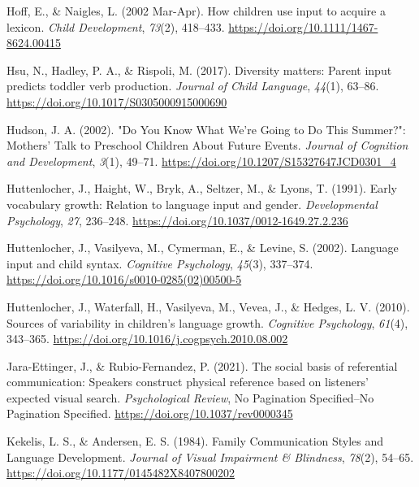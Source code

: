 \documentclass[
  man,floatsintext]{apa6}
\newlength{\cslhangindent}
\newlength{\cslentryspacingunit} %
\newenvironment{CSLReferences}[2] %
 {%
  \setlength{\parindent}{0pt}
  \ifodd #1
  \let\oldpar\par
  \def\par{\hangindent=\cslhangindent\oldpar}
  \fi
  \setlength{\parskip}{#2\cslentryspacingunit}
 }%
 {}
\begin{document}
\begin{CSLReferences}{1}{0}
\leavevmode{}%
Hoff, E., \& Naigles, L. (2002 Mar-Apr). How children use input to acquire a lexicon. \emph{Child Development}, \emph{73}(2), 418--433. \url{https://doi.org/10.1111/1467-8624.00415}

\leavevmode{}%
Hsu, N., Hadley, P. A., \& Rispoli, M. (2017). Diversity matters: Parent input predicts toddler verb production. \emph{Journal of Child Language}, \emph{44}(1), 63--86. \url{https://doi.org/10.1017/S0305000915000690}

\leavevmode{}%
Hudson, J. A. (2002). "{Do You Know What We}'re {Going} to {Do This Summer}?": {Mothers}' {Talk} to {Preschool Children About Future Events}. \emph{Journal of Cognition and Development}, \emph{3}(1), 49--71. \url{https://doi.org/10.1207/S15327647JCD0301_4}

\leavevmode{}%
Huttenlocher, J., Haight, W., Bryk, A., Seltzer, M., \& Lyons, T. (1991). Early vocabulary growth: {Relation} to language input and gender. \emph{Developmental Psychology}, \emph{27}, 236--248. \url{https://doi.org/10.1037/0012-1649.27.2.236}

\leavevmode{}%
Huttenlocher, J., Vasilyeva, M., Cymerman, E., \& Levine, S. (2002). Language input and child syntax. \emph{Cognitive Psychology}, \emph{45}(3), 337--374. \url{https://doi.org/10.1016/s0010-0285(02)00500-5}

\leavevmode{}%
Huttenlocher, J., Waterfall, H., Vasilyeva, M., Vevea, J., \& Hedges, L. V. (2010). Sources of variability in children's language growth. \emph{Cognitive Psychology}, \emph{61}(4), 343--365. \url{https://doi.org/10.1016/j.cogpsych.2010.08.002}

\leavevmode{}%
Jara-Ettinger, J., \& Rubio-Fernandez, P. (2021). The social basis of referential communication: {Speakers} construct physical reference based on listeners' expected visual search. \emph{Psychological Review}, No Pagination Specified--No Pagination Specified. \url{https://doi.org/10.1037/rev0000345}

\leavevmode{}%
Kekelis, L. S., \& Andersen, E. S. (1984). Family {Communication Styles} and {Language Development}. \emph{Journal of Visual Impairment \& Blindness}, \emph{78}(2), 54--65. \url{https://doi.org/10.1177/0145482X8407800202}


\end{CSLReferences}
\end{document}
